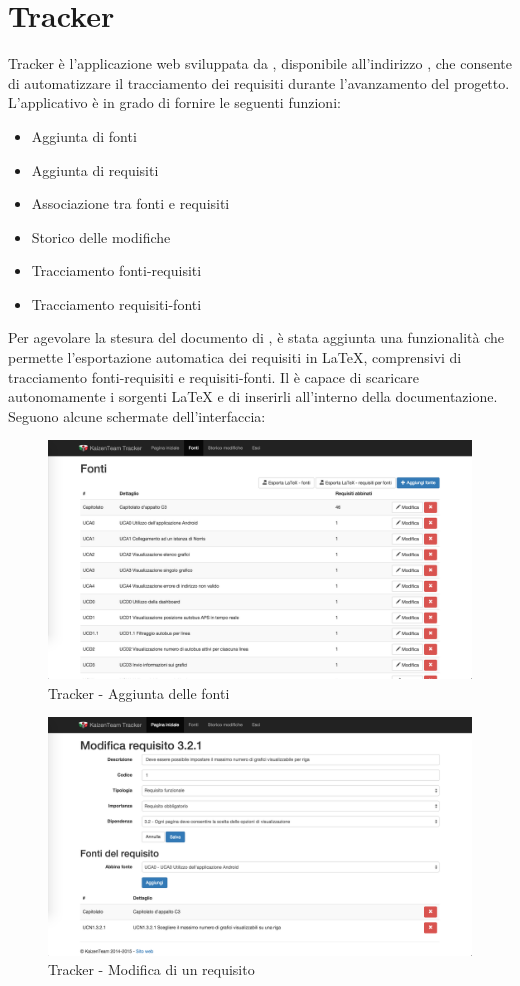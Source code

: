 \section{Tracker} \label{sec:tracker}

Tracker è l'applicazione web sviluppata da \groupname{}, disponibile all'indirizzo , che consente di automatizzare il tracciamento dei requisiti durante l’avanzamento del progetto. \\
L'applicativo è in grado di fornire le seguenti funzioni:
\begin{itemize}
	\item Aggiunta di fonti
	\item Aggiunta di requisiti
	\item Associazione tra fonti e requisiti
	\item Storico delle modifiche
	\item Tracciamento fonti-requisiti
	\item Tracciamento requisiti-fonti
\end{itemize}

Per agevolare la stesura del documento di , è stata aggiunta una funzionalità che permette l’esportazione automatica dei requisiti in \LaTeX{}, comprensivi di tracciamento fonti-requisiti e requisiti-fonti. Il  è capace di scaricare autonomamente i sorgenti \LaTeX{} e di inserirli all’interno della documentazione. \\
Seguono alcune schermate dell’interfaccia:

\begin{figure}[H]
	\centering
	\includegraphics[width=\textwidth]{Pics/TrackerFonti}
	\caption{Tracker - Aggiunta delle fonti}
\end{figure}


\begin{figure}[H]
	\centering
	\includegraphics[width=\textwidth]{Pics/TrackerModificaRequisito}
	\caption{Tracker - Modifica di un requisito}
\end{figure}